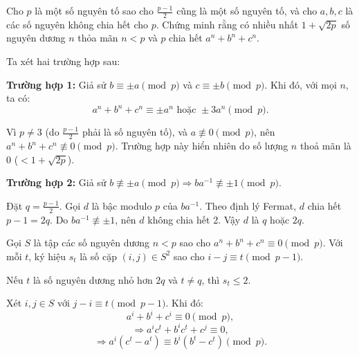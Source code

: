 \ifshowproblemandsoln
\ifshowproblem\begin{problem}\label{problem:CAN-2015-MO-P5}\fi
\ifshowsoln\begin{problem}\fi
    Cho $p$ là một số nguyên tố sao cho $\frac{p-1}{2}$ cũng là một số nguyên tố, và cho $a, b, c$ là các số nguyên không chia hết cho $p$.
    Chứng minh rằng có nhiều nhất $1 + \sqrt{2p}$ số nguyên dương $n$ thỏa mãn $n < p$ và $p$ chia hết $a^n + b^n + c^n$.
\end{problem}
\fi

\ifshowsoln
\begin{soln}\footnotemark
    Ta xét hai trường hợp sau:

    \textbf{Trường hợp 1:} Giả sử \( b \equiv \pm a \pmod{p} \) và \( c \equiv \pm b \pmod{p} \). Khi đó, với mọi \( n \), ta có:
    \[
        a^n + b^n + c^n \equiv \pm a^n \text{ hoặc } \pm 3a^n \pmod{p}.
    \]
    
    Vì \( p \ne 3 \) (do \( \frac{p - 1}{2} \) phải là số nguyên tố), và \( a \not\equiv 0 \pmod{p} \),
    nên \( a^n + b^n + c^n \not\equiv 0 \pmod{p} \). Trường hợp này hiển nhiên do số lượng $n$ thoả mãn là 0 ($<1+\sqrt{2p}$).

    \textbf{Trường hợp 2:} Giả sử \( b \not\equiv \pm a \pmod{p} \Rightarrow ba^{-1} \not\equiv \pm1 \pmod{p} \).

    Đặt \( q = \frac{p - 1}{2} \). Gọi $d$ là bậc modulo $p$ của \( ba^{-1} \). Theo định lý Fermat, $d$ chia hết \( p - 1 = 2q \).
    Do \( ba^{-1} \not\equiv \pm1 \), nên $d$ không chia hết 2. Vậy $d$ là \( q \) hoặc \( 2q \).

    Gọi \( S \) là tập các số nguyên dương \( n < p \) sao cho \( a^n + b^n + c^n \equiv 0 \pmod{p} \).
    Với mỗi \( t \), ký hiệu \( s_t \) là số cặp \((i, j) \in S^2\) sao cho \( i - j \equiv t \pmod{p - 1} \).

    \begin{lemma*}
        Nếu \( t \) là số nguyên dương nhỏ hơn \( 2q \) và \( t \ne q \), thì \( s_t \le 2 \).
    \end{lemma*}

    \begin{subproof}
        Xét \( i, j \in S \) với \( j - i \equiv t \pmod{p - 1} \). Khi đó:
        \[
            a^i + b^i + c^i \equiv 0 \pmod{p},
        \]
        \[
            \Rightarrow a^i c^t + b^i c^t + c^{j} \equiv 0,
        \]
        \[
            \Rightarrow a^i (c^t - a^t) \equiv b^i (b^t - c^t) \pmod{p}.
        \]


\end{subproof}
\end{soln}
\end{problem}
